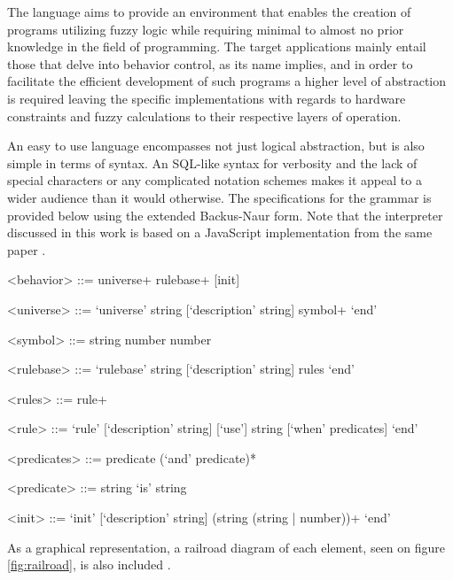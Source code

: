 The language aims to provide an environment that enables the creation of programs utilizing fuzzy logic while requiring minimal to almost no prior knowledge in the field of programming. The target applications mainly entail those that delve into behavior control, as its name implies, and in order to facilitate the efficient development of such programs a higher level of abstraction is required leaving the specific implementations with regards to hardware constraints and fuzzy calculations to their respective layers of operation.

An easy to use language encompasses not just logical abstraction, but is also simple in terms of syntax.
An SQL-like syntax for verbosity and the lack of special characters or any complicated notation schemes makes it appeal to a wider audience than it would otherwise. The specifications for the grammar is provided below using the extended Backus-Naur form. Note that the interpreter discussed in this work is based on a JavaScript implementation from the same paper \cite{pillerkovacs2015}.

\begin{grammar}
<behavior> ::= universe+ rulebase+ [init]

<universe> ::= `universe' string [`description' string] symbol+ `end'

<symbol> ::= string number number

<rulebase> ::= `rulebase' string [`description' string] rules `end'

<rules> ::= rule+

<rule> ::= `rule' [`description' string] [`use'] string [`when' predicates] `end'

<predicates> ::= predicate (`and' predicate)*

<predicate> ::= string `is' string

<init> ::= `init' [`description' string] (string (string | number))+ `end'
\end{grammar}

As a graphical representation, a railroad diagram of each element, seen on figure \ref{fig:railroad}, is also included \cite{pillerkovacs2015}.

